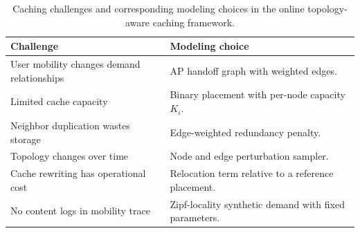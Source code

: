 \begin{table}[t]
\centering
\caption{Caching challenges and corresponding modeling choices in the online topology-aware caching framework.}
\label{tab:challenge_mapping}
\begin{tabular}{p{}p{}}
\toprule
Challenge & Modeling choice \\
\midrule
User mobility changes demand relationships & AP handoff graph with weighted edges. \\
Limited cache capacity & Binary placement with per-node capacity \(K_i\). \\
Neighbor duplication wastes storage & Edge-weighted redundancy penalty. \\
Topology changes over time & Node and edge perturbation sampler. \\
Cache rewriting has operational cost & Relocation term relative to a reference placement. \\
No content logs in mobility trace & Zipf-locality synthetic demand with fixed parameters. \\
\bottomrule
\end{tabular}
\end{table}
